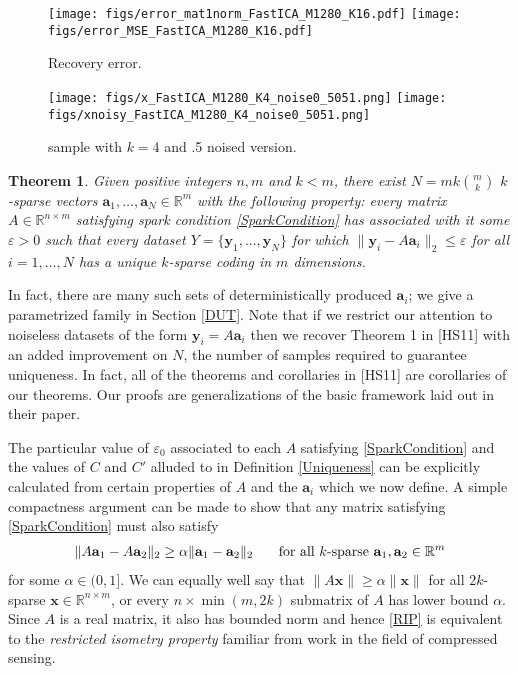 \documentclass[journal, onecolumn]{IEEEtran}
\newtheorem{theorem}{Theorem}
\begin{document}
\begin{figure*}[t!]
\begin{center}
\texttt{[image: figs/error\_mat1norm\_FastICA\_M1280\_K16.pdf]}
\texttt{[image: figs/error\_MSE\_FastICA\_M1280\_K16.pdf]}
\caption{Recovery error.}
\end{center}
\end{figure*}


\begin{figure*}[t!]
\begin{center}
\texttt{[image: figs/x\_FastICA\_M1280\_K4\_noise0\_5051.png]}
\texttt{[image: figs/xnoisy\_FastICA\_M1280\_K4\_noise0\_5051.png]}
\caption{sample with $k=4$ and .5 noised version.}
\end{center}
\end{figure*}

\begin{theorem}\label{DeterministicUniquenessTheorem}
Given positive integers $n, m$ and $k < m$, there exist $N =  mk{m \choose k}$ $k$-sparse vectors $\mathbf{a}_1, \ldots, \mathbf{a}_N \in \mathbb{R}^m$ with the following property: every matrix $A \in \mathbb{R}^{n \times m}$ satisfying spark condition \eqref{SparkCondition} has associated with it some $\varepsilon > 0$ such that every dataset $Y = \{ \mathbf{y}_1, ..., \mathbf{y}_N \}$ for which $\| \mathbf{y}_i - A\mathbf{a}_i \|_2 \leq \varepsilon$ for all $i = 1, \ldots, N$ has a unique $k$-sparse coding in $m$ dimensions. 
\end{theorem}

In fact, there are many such sets of deterministically produced $\mathbf{a}_i$; we give a parametrized family in Section \ref{DUT}. Note that if we restrict our attention to noiseless datasets of the form $\mathbf{y}_i = A\mathbf{a}_i$ then we recover Theorem 1 in [HS11] with an added improvement on $N$, the number of samples required to guarantee uniqueness. In fact, all of the theorems and corollaries in [HS11] are corollaries of our theorems. Our proofs are generalizations of the basic framework laid out in their paper.

The particular value of $\varepsilon_0$ associated to each $A$ satisfying \eqref{SparkCondition} and the values of $C$ and $C'$ alluded to in Definition \ref{Uniqueness} can be explicitly calculated from certain properties of $A$ and the $\mathbf{a}_i$ which we now define. A simple compactness argument can be made to show that any matrix satisfying \eqref{SparkCondition} must also satisfy
\begin{align}\label{RIP}
\|A\mathbf{a}_1 - A\mathbf{a}_2 \|_2 \geq  \alpha \|\mathbf{a}_1 - \mathbf{a}_2\|_2 \indent \text{ for all $k$-sparse } \mathbf{a}_1, \mathbf{a}_2 \in \mathbb{R}^m
\end{align}
%
for some $\alpha \in (0,1]$. We can equally well say that $\|A\mathbf{x}\| \geq \alpha\|\mathbf{x}\|$ for all $2k$-sparse $\mathbf{x} \in \mathbb{R}^{n \times m}$, or every $n \times \min(m,2k)$ submatrix of $A$ has lower bound $\alpha$. Since $A$ is a real matrix, it also has bounded norm and hence \eqref{RIP} is equivalent to the \emph{restricted isometry property} \cite{CandesTao05} familiar from work in the field of compressed sensing.
\end{document}
